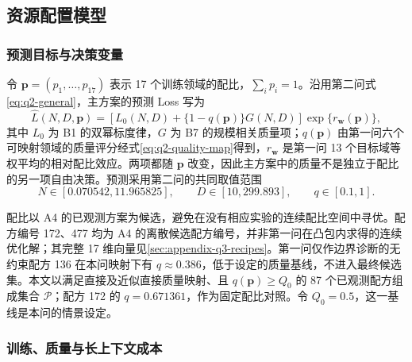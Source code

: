 \subsection{资源配置模型}

\subsubsection{预测目标与决策变量}

令 $\boldsymbol p=(p_1,\ldots,p_{17})$ 表示 17 个训练领域的配比，$\sum_i p_i=1$。沿用第二问式\eqref{eq:q2-general}，主方案的预测 Loss 写为
\begin{equation}
 \widehat L(N,D,\boldsymbol p)
 =\left[L_0(N,D)+\{1-q(\boldsymbol p)\}G(N,D)\right]
   \exp\{r_{\boldsymbol w}(\boldsymbol p)\},
 \label{eq:q3-objective}
\end{equation}
其中 $L_0$ 为 B1 的双幂标度律，$G$ 为 B7 的规模相关质量项；$q(\boldsymbol p)$ 由第一问六个可映射领域的质量评分经式\eqref{eq:q2-quality-map}得到，$r_{\boldsymbol w}$ 是第一问 13 个目标域等权平均的相对配比效应。两项都随 $\boldsymbol p$ 改变，因此主方案中的质量不是独立于配比的另一项自由决策。预测采用第二问的共同取值范围
\begin{equation}
 N\in[0.070542,11.965825],\qquad
 D\in[10,299.893],\qquad q\in[0.1,1].
 \label{eq:q3-support}
\end{equation}

配比以 A4 的已观测方案为候选，避免在没有相应实验的连续配比空间中寻优。配方编号 172、477 均为 A4 的离散候选配方编号，并非第一问在凸包内求得的连续优化解；其完整 17 维向量见\ref{sec:appendix-q3-recipes}。第一问仅作边界诊断的无约束配方 136 在本问映射下有 $q\approx0.386$，低于设定的质量基线，不进入最终候选集。本文以满足直接及近似直接质量映射、且 $q(\boldsymbol p)\geq Q_0$ 的 87 个已观测配方组成集合 $\mathcal P$；配方 172 的 $q=0.671361$，作为固定配比对照。令 $Q_0=0.5$，这一基线是本问的情景设定。

\subsubsection{训练、质量与长上下文成本}

